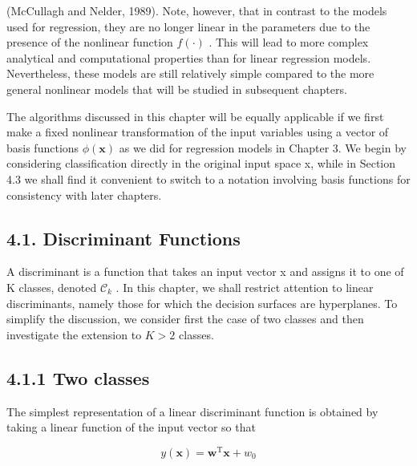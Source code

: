 \documentclass[
  10
]{article}
\author{}
\date{}
\begin{document}
(McCullagh and Nelder, 1989). Note, however, that in contrast to the
models used for regression, they are no longer linear in the parameters
due to the presence of the nonlinear function \(f ( \cdot )\) . This
will lead to more complex analytical and computational properties than
for linear regression models. Nevertheless, these models are still
relatively simple compared to the more general nonlinear models that
will be studied in subsequent chapters.

The algorithms discussed in this chapter will be equally applicable if
we first make a fixed nonlinear transformation of the input variables
using a vector of basis functions \(\phi ( \mathbf { x } )\) as we did
for regression models in Chapter 3. We begin by considering
classification directly in the original input space x, while in Section
4.3 we shall find it convenient to switch to a notation involving basis
functions for consistency with later chapters.

\subsection{4.1. Discriminant Functions}\label{discriminant-functions}

A discriminant is a function that takes an input vector x and assigns it
to one of K classes, denoted \(\mathcal { C } _ { k }\) . In this
chapter, we shall restrict attention to linear discriminants, namely
those for which the decision surfaces are hyperplanes. To simplify the
discussion, we consider first the case of two classes and then
investigate the extension to \(K > 2\) classes.

\subsection{4.1.1 Two classes}\label{two-classes}

The simplest representation of a linear discriminant function is
obtained by taking a linear function of the input vector so that

\[
y (\mathbf {x}) = \mathbf {w} ^ {\mathrm{T}} \mathbf {x} + w _ {0}\tag{4.4}
\]
\end{document}
